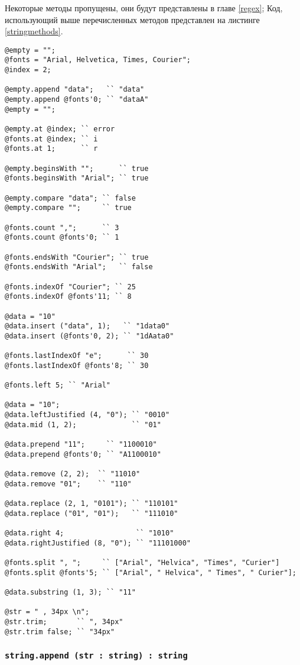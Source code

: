 Некоторые методы пропущены, они будут представлены в главе \ref{regex}; Код, использующий выше перечисленных методов представлен на листинге \ref{stringmethods}.

\begin{lstlisting}[caption=Методы класса string, label=stringmethods]
@empty = "";
@fonts = "Arial, Helvetica, Times, Courier";
@index = 2;

@empty.append "data";   `` "data"
@empty.append @fonts'0; `` "dataA"
@empty = "";

@empty.at @index; `` error
@fonts.at @index; `` i
@fonts.at 1;	  `` r

@empty.beginsWith "";      `` true
@fonts.beginsWith "Arial"; `` true

@empty.compare "data"; `` false
@empty.compare "";     `` true

@fonts.count ",";      `` 3
@fonts.count @fonts'0; `` 1

@fonts.endsWith "Courier"; `` true
@fonts.endsWith "Arial";   `` false

@fonts.indexOf "Courier"; `` 25
@fonts.indexOf @fonts'11; `` 8

@data = "10"
@data.insert ("data", 1);   `` "1data0"
@data.insert (@fonts'0, 2); `` "1dAata0"

@fonts.lastIndexOf "e";      `` 30
@fonts.lastIndexOf @fonts'8; `` 30

@fonts.left 5; `` "Arial"

@data = "10";
@data.leftJustified (4, "0"); `` "0010"
@data.mid (1, 2);             `` "01"

@data.prepend "11";     `` "1100010"
@data.prepend @fonts'0; `` "A1100010"

@data.remove (2, 2);  `` "11010"
@data.remove "01";    `` "110"

@data.replace (2, 1, "0101"); `` "110101"
@data.replace ("01", "01");   `` "111010"

@data.right 4; 				   `` "1010"
@data.rightJustified (8, "0"); `` "11101000"

@fonts.split ", ";     `` ["Arial", "Helvica", "Times", "Curier"]
@fonts.split @fonts'5; `` ["Arial", " Helvica", " Times", " Curier"];

@data.substring (1, 3); `` "11"

@str = " , 34px \n";
@str.trim;       `` ", 34px"
@str.trim false; `` "34px"
\end{lstlisting}

\subsubsection{\lstinline|string.append (str : string) : string|}

